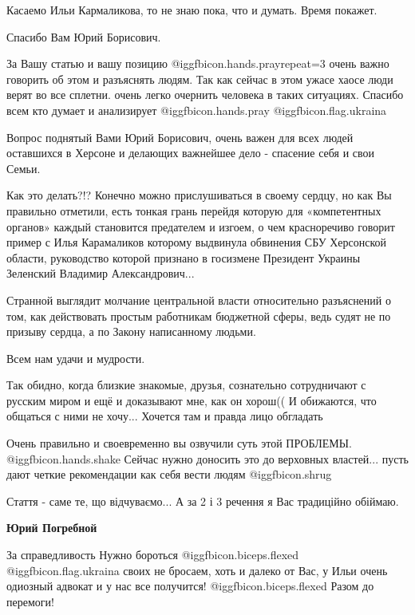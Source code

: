 \begin{itemize}
Касаемо Ильи Кармаликова, то не знаю пока, что и думать. Время покажет.


Спасибо Вам Юрий Борисович.

За Вашу статью и вашу позицию  @igg{fbicon.hands.pray}{repeat=3}  очень важно говорить об этом и разъяснять
людям. Так как сейчас в этом ужасе хаосе люди верят во все сплетни. очень легко
очернить человека в таких ситуациях. Спасибо всем кто думает и анализирует
 @igg{fbicon.hands.pray}  @igg{fbicon.flag.ukraina}


Вопрос поднятый Вами Юрий Борисович, очень важен для всех людей оставшихся в
Херсоне и делающих важнейшее дело - спасение себя и свои Семьи.

Как это делать?!? Конечно можно прислушиваться в своему сердцу, но как Вы
правильно отметили, есть тонкая грань перейдя которую для «компетентных
органов» каждый становится предателем и изгоем, о чем красноречиво говорит
пример с Илья Карамаликов которому выдвинула обвинения СБУ Херсонской области,
руководство которой признано в госизмене Президент Украины Зеленский Владимир
Александрович...

Странной выглядит молчание центральной власти относительно разъяснений о том,
как действовать простым работникам бюджетной сферы, ведь судят не по призыву
сердца, а по Закону написанному людьми.

Всем нам удачи и мудрости.


Так обидно, когда близкие знакомые, друзья, сознательно сотрудничают с русским
миром и ещё и доказывают мне, как он хорош(( И обижаются, что общаться с ними не
хочу... Хочется там и правда лицо обгладать


Очень правильно и своевременно вы озвучили суть этой ПРОБЛЕМЫ. @igg{fbicon.hands.shake}  Сейчас нужно
доносить это до верховных властей... пусть дают четкие рекомендации как себя
вести людям  @igg{fbicon.shrug} 

Стаття - саме те, що відчуваємо... А за 2 і 3 речення я Вас традиційно обіймаю.

\textbf{Юрий Погребной} 

За справедливость Нужно бороться  @igg{fbicon.biceps.flexed} @igg{fbicon.flag.ukraina} своих не бросаем, хоть и далеко от Вас,
у Ильи очень одиозный адвокат и у нас все получится!  @igg{fbicon.biceps.flexed}  Разом до перемоги!


\end{itemize}
